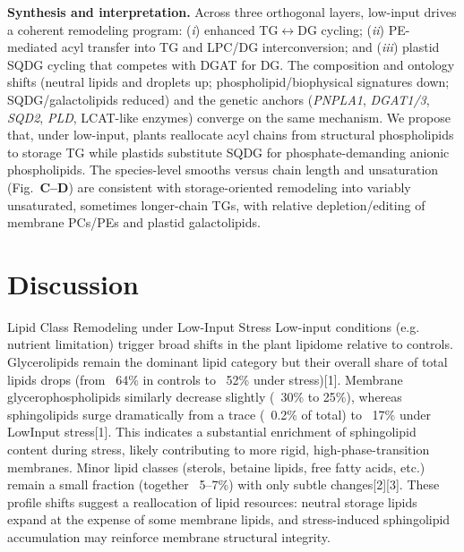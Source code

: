 \documentclass[10pt,letterpaper]{article}
\begin{document}
\noindent \textbf{Synthesis and interpretation.}
Across three orthogonal layers, low-input drives a coherent remodeling program: (\emph{i}) enhanced TG$\leftrightarrow$DG cycling; (\emph{ii}) PE-mediated acyl transfer into TG and LPC/DG interconversion; and (\emph{iii}) plastid SQDG cycling that competes with DGAT for DG. The composition and ontology shifts (neutral lipids and droplets up; phospholipid/biophysical signatures down; SQDG/galactolipids reduced) and the genetic anchors (\textit{PNPLA1}, \textit{DGAT1/3}, \textit{SQD2}, \textit{PLD}, LCAT-like enzymes) converge on the same mechanism. We propose that, under low-input, plants reallocate acyl chains from structural phospholipids to storage TG while plastids substitute SQDG for phosphate-demanding anionic phospholipids. The species-level smooths versus chain length and unsaturation (Fig.\ \textbf{C–D}) are consistent with storage-oriented remodeling into variably unsaturated, sometimes longer-chain TGs, with relative depletion/editing of membrane PCs/PEs and plastid galactolipids.













\section*{Discussion}
Lipid Class Remodeling under Low-Input Stress
Low-input conditions (e.g. nutrient limitation) trigger broad shifts in the plant lipidome relative to controls. Glycerolipids remain the dominant lipid category but their overall share of total lipids drops (from ~64\% in controls to ~52\% under stress)[1]. Membrane glycerophospholipids similarly decrease slightly (~30\% to 25\%), whereas sphingolipids surge dramatically from a trace (~0.2\% of total) to ~17\% under LowInput stress[1]. This indicates a substantial enrichment of sphingolipid content during stress, likely contributing to more rigid, high-phase-transition membranes. Minor lipid classes (sterols, betaine lipids, free fatty acids, etc.) remain a small fraction (together ~5–7\%) with only subtle changes[2][3]. These profile shifts suggest a reallocation of lipid resources: neutral storage lipids expand at the expense of some membrane lipids, and stress-induced sphingolipid accumulation may reinforce membrane structural integrity.
\end{document}
